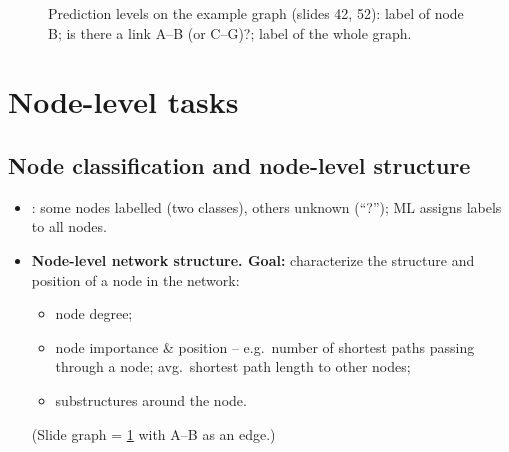 \begin{figure}[htbp]
  \centering
  \caption{Prediction levels on the example graph (slides 42, 52): label of node B; is
  there a link A--B (or C--G)?; label of the whole graph.}\label{fig:lec01-tasks}
\end{figure}

\section{Node-level tasks}\label{sec:lec01-node}

\subsection{Node classification and node-level structure}\label{sec:lec01-node-class}

\begin{itemize}
  \item {}: some nodes labelled (two classes), others unknown
    (``?''); ML assigns labels to all nodes.
  \item \textbf{Node-level network structure. Goal:} characterize the structure and
    position of a node in the network:
    \begin{itemize}
      \item node degree;
      \item node importance \& position -- e.g.\ number of shortest paths passing through a
        node; avg.\ shortest path length to other nodes;
      \item substructures around the node.
    \end{itemize}
    (Slide graph = \cref{fig:lec01-tasks} with A--B as an edge.)
\end{itemize}

